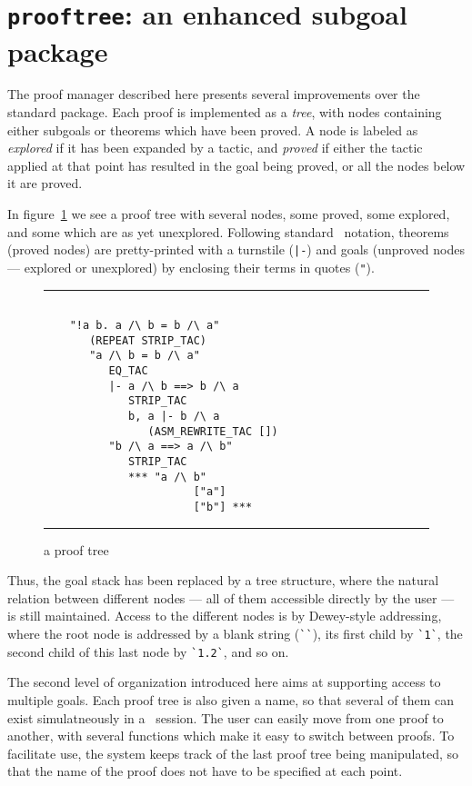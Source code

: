 \section{ {\tt prooftree}: an enhanced subgoal package}

The proof manager described here presents several improvements over
the standard package.  Each proof is implemented as a {\em
tree}, with nodes containing either subgoals or theorems which have
been proved. A node is labeled as {\em explored} if it has
been expanded by a tactic, and {\em proved} if either the tactic
applied at that point has resulted in the goal being proved, or all
the nodes below it are proved.

In figure~\ref{showproof} we see a proof tree with several nodes, some
proved, some explored, and some which are as yet unexplored.
Following standard \HOL\ notation, theorems (proved nodes) are
pretty-printed with a turnstile (\verb?|-?)  and goals (unproved nodes
--- explored or unexplored) by enclosing their terms in quotes
(\verb|"|).

\begin{figure} \hrule
{\small
\begin{verbatim}

	"!a b. a /\ b = b /\ a"
	   (REPEAT STRIP_TAC)
	   "a /\ b = b /\ a"
	      EQ_TAC
	      |- a /\ b ==> b /\ a
	         STRIP_TAC
	         b, a |- b /\ a
	            (ASM_REWRITE_TAC [])
	      "b /\ a ==> a /\ b"
	         STRIP_TAC
	         *** "a /\ b"
	                   ["a"]
	                   ["b"] ***

\end{verbatim} }
\hrule
\caption{a proof tree}
\label{showproof}
\end{figure}

Thus, the goal stack has been replaced by a tree structure, where the
natural relation between different nodes --- all of them accessible
directly by the user --- is still maintained. Access to the different
nodes is by Dewey-style addressing, where the root node is addressed
by a blank string (\verb|``|), its first child by \verb|`1`|, the
second child of this last node by \verb|`1.2`|, and so on.


The second level of organization introduced here aims at supporting
access to multiple goals.  Each proof tree is also given a name, so
that several of them can exist simulatneously in a \HOL\ session. The
user can easily move from one proof to another, with several
functions which make it easy to switch between proofs. To facilitate
use, the system keeps track of the last proof tree being manipulated,
so that the name of the proof does not have to be specified at each
point.

